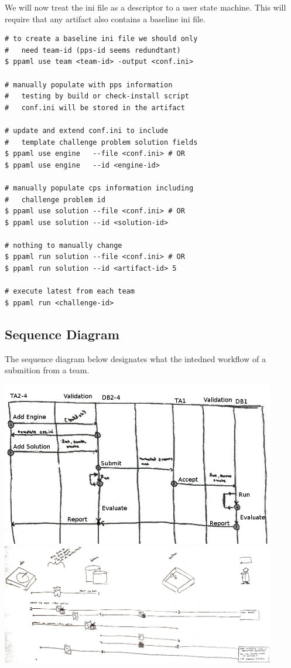 \documentclass[11pt]{article} %
\begin{document}
\begin{multicols}{2}
  We will now treat the ini file as a descriptor to a user state machine. This will require that any artifact also contains a baseline ini file.
  \begin{lstlisting}
# to create a baseline ini file we should only
#   need team-id (pps-id seems redundtant)
$ ppaml use team <team-id> -output <conf.ini>

# manually populate with pps information
#   testing by build or check-install script
#   conf.ini will be stored in the artifact

# update and extend conf.ini to include
#   template challenge problem solution fields
$ ppaml use engine   --file <conf.ini> # OR
$ ppaml use engine   --id <engine-id>

# manually populate cps information including 
#   challenge problem id
$ ppaml use solution --file <conf.ini> # OR
$ ppaml use solution --id <solution-id>

# nothing to manually change
$ ppaml run solution --file <conf.ini> # OR
$ ppaml run solution --id <artifact-id> 5

# execute latest from each team
$ ppaml run <challenge-id>
  \end{lstlisting}
  \vfill
  \end{multicols}

  \subsection*{Sequence Diagram}

  The sequence diagram below designates what the intedned workflow of a submition from a team. 

  \begin{center}
    \includegraphics[width=0.9\textwidth]{sequence_diagram.jpg}
    \includegraphics[width=0.9\textwidth]{more_sequence.jpg}
  \end{center}
  
\end{document}
